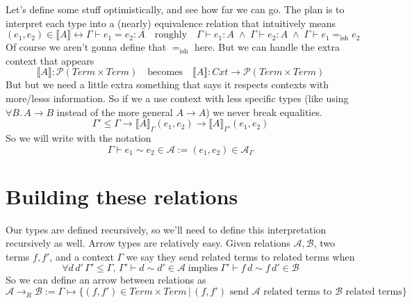 \documentclass[12pt]{article}
\begin{document}
Let's define some stuff optimistically, and see how far we can go.
The plan is to interpret each type into a (nearly) equivalence relation that intuitively means
\[
  (e_1,e_2) \in \llbracket A \rrbracket \leftrightarrow \Gamma \vdash e_1 = e_2 : A
  \quad\text{roughly}\quad \Gamma \vdash e_1 : A \; \land \; \Gamma \vdash e_2 : A \; \land \;  \Gamma \vdash e_1 =_\text{ish} e_2
\]
Of course we aren't gonna define that $=_\text{ish}$ here.
But we can handle the extra context that appears
\[
\llbracket A \rrbracket : \mathcal{P}(Term \times Term) \quad\text{becomes}\quad
\llbracket A \rrbracket : Cxt \rightarrow \mathcal{P}(Term \times Term)
\]
But but we need a little extra something that says it respects contexts with more/lesss information. So if we a use context with less specific types (like using $\forall B.\,A \rightarrow B$ instead of the more general $A \rightarrow A$) we never break equalities.
\[
\Gamma' \leq \Gamma \rightarrow \llbracket A \rrbracket_{\Gamma} (e_1,e_2) \rightarrow \llbracket A \rrbracket_{\Gamma'} (e_1,e_2)
\]
So we will write with the notation
\[
\Gamma \vdash e_1 \sim e_2 \in \mathcal{A} := (e_1,e_2) \in \mathcal{A}_\Gamma
\]

\section{Building these relations}
Our types are defined recursively, so we'll need to define this interpretation recursively as well. 
Arrow types are relatively easy.
Given relations $\mathcal{A}, \mathcal{B}$, two terms $f,f'$, and a context $\Gamma$ we say they send related terms to related terms when 
\[
  \forall d\, d'\, \Gamma' \leq \Gamma,\, \Gamma' \vdash d \sim d' \in \mathcal{A}
  \;\text{implies}\; \Gamma' \vdash f\, d \sim f\,d' \in \mathcal{B}
\]
So we can define an arrow between relations as
\[
\mathcal{A} \rightarrow_R \mathcal{B} := \Gamma \mapsto 
  \{ (f,f') \in Term \times Term \, |\, (f,f') \text{ send $\mathcal{A}$ related terms to $\mathcal{B}$ related terms}
  \}
\]
\end{document}
